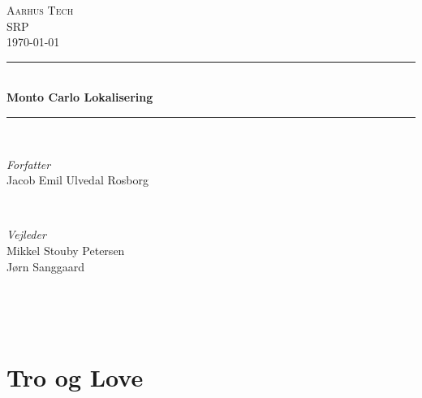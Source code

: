 \documentclass[../SRP.tex]{subfiles}
\begin{document}
\begin{titlepage}
  \newcommand{\HRule}{\rule{\linewidth}{0.5mm}}

	\center

	\textsc{\LARGE Aarhus Tech} \\[0.25cm]
  \textsc{\Large SRP} \\[0.5cm]



  {\large\today}
  \\[1cm]

	\HRule\\[0.4cm]
	{\huge\bfseries Monto Carlo Lokalisering}\\[0.1cm]

	\HRule\\[1.5cm]

	\begin{minipage}{0.4\textwidth}
		\begin{flushleft}
			\large
			\textit{Forfatter}\\
			Jacob Emil Ulvedal Rosborg %
		\end{flushleft}
	\end{minipage}
	~
	\begin{minipage}{0.4\textwidth}
		\begin{flushright}
			\large
			\textit{Vejleder}\\
			Mikkel Stouby Petersen\\
			Jørn Sanggaard
		\end{flushright}
	\end{minipage}\\[4.0cm]

  \begin{center}
  \begin{minipage}{0.8\textwidth}
    \\
    \justify
    \lipsum[1]
  \end{minipage}
  \end{center}
\end{titlepage}

\chapter*{Tro og Love}
\end{document}
